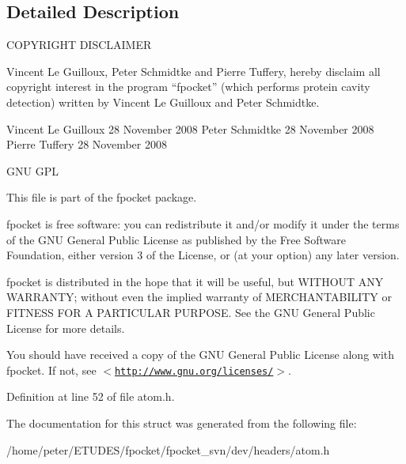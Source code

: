 \subsection{Detailed Description}
COPYRIGHT DISCLAIMER

Vincent Le Guilloux, Peter Schmidtke and Pierre Tuffery, hereby disclaim all copyright interest in the program “fpocket” (which performs protein cavity detection) written by Vincent Le Guilloux and Peter Schmidtke.

Vincent Le Guilloux 28 November 2008 Peter Schmidtke 28 November 2008 Pierre Tuffery 28 November 2008

GNU GPL

This file is part of the fpocket package.

fpocket is free software: you can redistribute it and/or modify it under the terms of the GNU General Public License as published by the Free Software Foundation, either version 3 of the License, or (at your option) any later version.

fpocket is distributed in the hope that it will be useful, but WITHOUT ANY WARRANTY; without even the implied warranty of MERCHANTABILITY or FITNESS FOR A PARTICULAR PURPOSE. See the GNU General Public License for more details.

You should have received a copy of the GNU General Public License along with fpocket. If not, see $<$\href{http://www.gnu.org/licenses/}{\tt http://www.gnu.org/licenses/}$>$. 

Definition at line 52 of file atom.h.

The documentation for this struct was generated from the following file:\begin{CompactItemize}
\item 
/home/peter/ETUDES/fpocket/fpocket\_\-svn/dev/headers/atom.h\end{CompactItemize}

